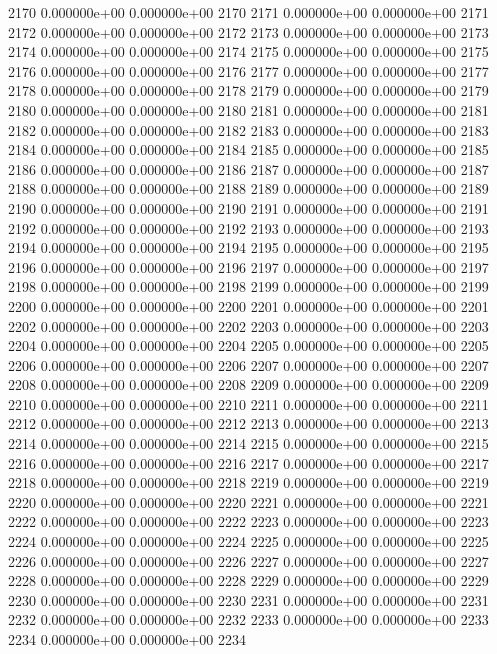 \documentclass{article}
\begin{document}
\begin{Schunk}
\begin{Soutput}
2170   0.000000e+00   0.000000e+00 2170
2171   0.000000e+00   0.000000e+00 2171
2172   0.000000e+00   0.000000e+00 2172
2173   0.000000e+00   0.000000e+00 2173
2174   0.000000e+00   0.000000e+00 2174
2175   0.000000e+00   0.000000e+00 2175
2176   0.000000e+00   0.000000e+00 2176
2177   0.000000e+00   0.000000e+00 2177
2178   0.000000e+00   0.000000e+00 2178
2179   0.000000e+00   0.000000e+00 2179
2180   0.000000e+00   0.000000e+00 2180
2181   0.000000e+00   0.000000e+00 2181
2182   0.000000e+00   0.000000e+00 2182
2183   0.000000e+00   0.000000e+00 2183
2184   0.000000e+00   0.000000e+00 2184
2185   0.000000e+00   0.000000e+00 2185
2186   0.000000e+00   0.000000e+00 2186
2187   0.000000e+00   0.000000e+00 2187
2188   0.000000e+00   0.000000e+00 2188
2189   0.000000e+00   0.000000e+00 2189
2190   0.000000e+00   0.000000e+00 2190
2191   0.000000e+00   0.000000e+00 2191
2192   0.000000e+00   0.000000e+00 2192
2193   0.000000e+00   0.000000e+00 2193
2194   0.000000e+00   0.000000e+00 2194
2195   0.000000e+00   0.000000e+00 2195
2196   0.000000e+00   0.000000e+00 2196
2197   0.000000e+00   0.000000e+00 2197
2198   0.000000e+00   0.000000e+00 2198
2199   0.000000e+00   0.000000e+00 2199
2200   0.000000e+00   0.000000e+00 2200
2201   0.000000e+00   0.000000e+00 2201
2202   0.000000e+00   0.000000e+00 2202
2203   0.000000e+00   0.000000e+00 2203
2204   0.000000e+00   0.000000e+00 2204
2205   0.000000e+00   0.000000e+00 2205
2206   0.000000e+00   0.000000e+00 2206
2207   0.000000e+00   0.000000e+00 2207
2208   0.000000e+00   0.000000e+00 2208
2209   0.000000e+00   0.000000e+00 2209
2210   0.000000e+00   0.000000e+00 2210
2211   0.000000e+00   0.000000e+00 2211
2212   0.000000e+00   0.000000e+00 2212
2213   0.000000e+00   0.000000e+00 2213
2214   0.000000e+00   0.000000e+00 2214
2215   0.000000e+00   0.000000e+00 2215
2216   0.000000e+00   0.000000e+00 2216
2217   0.000000e+00   0.000000e+00 2217
2218   0.000000e+00   0.000000e+00 2218
2219   0.000000e+00   0.000000e+00 2219
2220   0.000000e+00   0.000000e+00 2220
2221   0.000000e+00   0.000000e+00 2221
2222   0.000000e+00   0.000000e+00 2222
2223   0.000000e+00   0.000000e+00 2223
2224   0.000000e+00   0.000000e+00 2224
2225   0.000000e+00   0.000000e+00 2225
2226   0.000000e+00   0.000000e+00 2226
2227   0.000000e+00   0.000000e+00 2227
2228   0.000000e+00   0.000000e+00 2228
2229   0.000000e+00   0.000000e+00 2229
2230   0.000000e+00   0.000000e+00 2230
2231   0.000000e+00   0.000000e+00 2231
2232   0.000000e+00   0.000000e+00 2232
2233   0.000000e+00   0.000000e+00 2233
2234   0.000000e+00   0.000000e+00 2234

\end{Soutput}
\end{Schunk}
\end{document}
